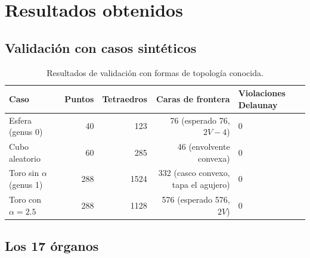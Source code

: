 \documentclass[12pt,a4paper]{article}
\begin{document}
\section{Resultados obtenidos}

\subsection{Validación con casos sintéticos}
\label{sec:resultados-sinteticos}

\begin{table}[H]
\centering
\caption{Resultados de validación con formas de topología conocida.}
\begin{tabular}{@{}lrrrl@{}}
\toprule
\textbf{Caso} & \textbf{Puntos} & \textbf{Tetraedros} & \textbf{Caras de frontera} & \textbf{Violaciones Delaunay} \\
\midrule
Esfera (genus 0)     & 40  & 123  & 76 (esperado 76, $2V{-}4$)  & 0 \\
Cubo aleatorio        & 60  & 285  & 46 (envolvente convexa)     & 0 \\
Toro sin $\alpha$ (genus 1) & 288 & 1524 & 332 (casco convexo, tapa el agujero) & 0 \\
Toro con $\alpha=2.5$  & 288 & 1128 & 576 (esperado 576, $2V$)    & 0 \\
\bottomrule
\end{tabular}
\end{table}

\subsection{Los 17 órganos}
\end{document}
